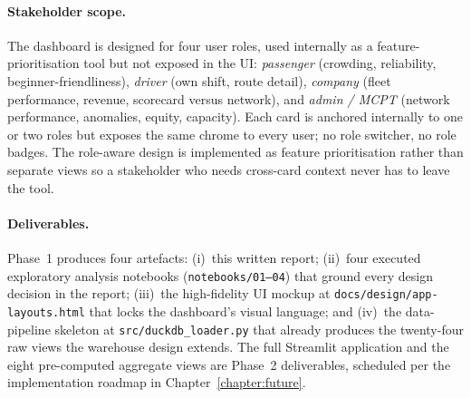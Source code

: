 \paragraph{Stakeholder scope.}
The dashboard is designed for four user roles, used internally as
a feature-prioritisation tool but not exposed in the UI:
\emph{passenger} (crowding, reliability, beginner-friendliness),
\emph{driver} (own shift, route detail),
\emph{company} (fleet performance, revenue, scorecard versus
network), and \emph{admin / MCPT} (network performance,
anomalies, equity, capacity). Each card is anchored internally to
one or two roles but exposes the same chrome to every user; no
role switcher, no role badges. The role-aware design is
implemented as feature prioritisation rather than separate views
so a stakeholder who needs cross-card context never has to leave
the tool.

\paragraph{Deliverables.}
Phase~1 produces four artefacts: (i)~this written report;
(ii)~four executed exploratory analysis notebooks
(\texttt{notebooks/01--04}) that ground every design decision in
the report; (iii)~the high-fidelity UI mockup at
\texttt{docs/design/app-layouts.html} that locks the dashboard's
visual language; and (iv)~the data-pipeline skeleton at
\texttt{src/duckdb\_loader.py} that already produces the
twenty-four raw views the warehouse design extends. The full
Streamlit application and the eight pre-computed aggregate views
are Phase~2 deliverables, scheduled per the implementation
roadmap in Chapter~\ref{chapter:future}.
